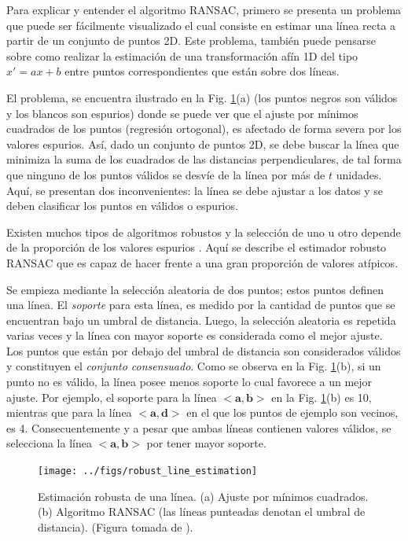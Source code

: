 Para explicar y entender el algoritmo RANSAC, primero se presenta un problema que puede ser fácilmente visualizado el cual consiste en estimar una línea recta a partir de un conjunto de puntos 2D. Este problema, también puede pensarse sobre como realizar la estimación de una transformación afín 1D del tipo $x'=ax+b$ entre puntos correspondientes que están sobre dos líneas. 

El problema, se encuentra ilustrado en la Fig. \ref{fig:example_ransac}(a) (los puntos negros son válidos y los blancos son espurios) donde se puede ver que el ajuste por mínimos cuadrados de los puntos (regresión ortogonal), es afectado de forma severa por los valores espurios. Así, dado un conjunto de puntos 2D, se debe buscar la línea que minimiza la suma de los cuadrados de las distancias perpendiculares, %
de tal forma que ninguno de los puntos válidos se desvíe de la línea por más de $t$ unidades. Aquí, se presentan dos inconvenientes: la línea se debe ajustar a los datos y se deben clasificar los puntos en válidos o espurios.

Existen muchos tipos de algoritmos robustos y la selección de uno u otro depende de la proporción de los valores espurios \cite{Hartley2004}. Aquí se describe el estimador robusto RANSAC que es capaz de hacer frente a una gran proporción de valores atípicos.

Se empieza mediante la selección aleatoria de dos puntos; estos puntos definen una línea. El \textit{soporte} para esta línea, es medido por la cantidad de puntos que se encuentran bajo un umbral de distancia. Luego, la selección aleatoria es repetida varias veces y la línea con mayor soporte es considerada como el mejor ajuste. Los puntos que están por debajo del umbral de distancia son considerados válidos y constituyen el \textit{conjunto consensuado}. Como se observa en la Fig. \ref{fig:example_ransac}(b), si un punto no es válido, la línea posee menos soporte lo cual favorece a un mejor ajuste. Por ejemplo, el soporte para la línea $<\mathbf{a},\mathbf{b}>$ en la Fig. \ref{fig:example_ransac}(b) es 10, mientras que para la línea $<\mathbf{a},\mathbf{d}>$ en el que los puntos de ejemplo son vecinos, es 4. Consecuentemente y a pesar que ambas líneas contienen valores válidos, se selecciona la línea $<\mathbf{a},\mathbf{b}>$ por tener mayor soporte.
\begin{figure}[tbhp]
  \centerline{\texttt{[image: ../figs/robust\_line\_estimation]}}
  \caption[Estimación robusta de una línea]{Estimación robusta de una línea. (a) Ajuste por mínimos cuadrados. (b) Algoritmo RANSAC (las líneas punteadas denotan el umbral de distancia). (Figura tomada de \cite{Hartley2004}).}
\label{fig:example_ransac}  
\end{figure}

